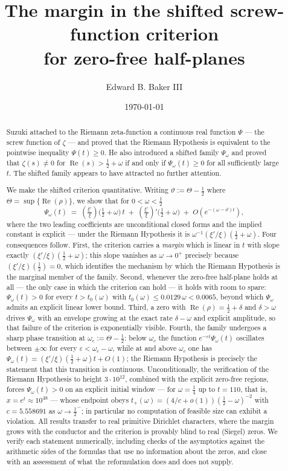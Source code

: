 \documentclass[11pt,reqno]{amsart}
\title[The margin in the shifted screw-function criterion]
      {The margin in the shifted screw-function criterion\\ for zero-free half-planes}
\author{Edward B. Baker III}
\date{\today}
\theoremstyle{plain}
\theoremstyle{definition}
\newcommand{\Rp}{\operatorname{Re}}
\newcommand{\lxi}[1]{\left(\tfrac{\xi'}{\xi}\right)\!#1}
\begin{document}
\begin{abstract}
Suzuki attached to the Riemann zeta-function a continuous real function $\Psi$ --- the screw
function of $\zeta$ --- and proved that the Riemann Hypothesis is equivalent to the pointwise
inequality $\Psi(t)\ge 0$. He also introduced a shifted family $\Psi_\omega$ and proved that
$\zeta(s)\neq 0$ for $\Rp(s)>\tfrac12+\omega$ if and only if $\Psi_\omega(t)\ge 0$ for all
sufficiently large $t$. The shifted family appears to have attracted no further attention.

We make the shifted criterion quantitative. Writing $\vartheta:=\Theta-\tfrac12$ where
$\Theta=\sup\{\Rp(\rho)\}$, we show that for $0<\omega<\tfrac12$
\[
  \Psi_\omega(t)\;=\;\lxi{\bigl(\tfrac12+\omega\bigr)}\,t \;+\; \lxi{'\bigl(\tfrac12+\omega\bigr)}
  \;+\;O\!\left(e^{-(\omega-\vartheta)t}\right),
\]
where the two leading coefficients are unconditional closed forms and the implied constant is
explicit --- under the Riemann Hypothesis it is $\omega^{-1}(\xi'/\xi)(\tfrac12+\omega)$. Four
consequences follow. First, the criterion carries a \emph{margin} which is linear in $t$ with slope
exactly $(\xi'/\xi)(\tfrac12+\omega)$; this slope vanishes as $\omega\to0^{+}$ precisely because
$(\xi'/\xi)(\tfrac12)=0$, which identifies the mechanism by which the Riemann Hypothesis is the
marginal member of the family. Second, whenever the zero-free half-plane holds at all --- the only
case in which the criterion can hold --- it holds with room to spare: $\Psi_\omega(t)>0$ for every
$t>t_0(\omega)$ with $t_0(\omega)\le 0.0129\,\omega<0.0065$, beyond which $\Psi_\omega$ admits an
explicit linear lower bound. Third, a zero with $\Rp(\rho)=\tfrac12+\delta$ and $\delta>\omega$
drives $\Psi_\omega$ with an envelope growing at the exact rate $\delta-\omega$ and explicit
amplitude, so that failure of the criterion is exponentially visible. Fourth, the family undergoes
a sharp phase transition at $\omega_c:=\Theta-\tfrac12$: below $\omega_c$ the function
$e^{-\varepsilon t}\Psi_\omega(t)$ oscillates between $\pm\infty$ for every
$\varepsilon<\omega_c-\omega$, while at and above $\omega_c$ one has
$\Psi_\omega(t)=(\xi'/\xi)(\tfrac12+\omega)t+O(1)$; the Riemann Hypothesis is precisely the
statement that this transition is continuous. Unconditionally, the verification of the Riemann
Hypothesis to height $3\cdot10^{12}$, combined with the explicit zero-free regions, forces
$\Psi_\omega(t)>0$ on an explicit initial window --- for $\omega=\tfrac14$ up to $t=110$, that is,
$x=e^{t}\approx10^{48}$ --- whose endpoint obeys $t_+(\omega)=(4/c+o(1))(\tfrac12-\omega)^{-2}$
with $c=5.558691$ as $\omega\to\tfrac12^{-}$; in particular no computation of feasible size can
exhibit a violation. All results transfer to real primitive Dirichlet characters, where the margin
grows with the conductor and the criterion is provably blind to real (Siegel) zeros. We verify
each statement numerically, including checks of the asymptotics against the arithmetic sides of
the formulas that use no information about the zeros, and close with an assessment of what the
reformulation does and does not supply.
\end{abstract}
\end{document}
